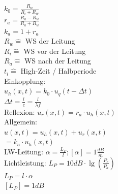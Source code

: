 \documentclass[8pt]{extarticle}
\begin{document}
\begin{minipage}{0.33\textwidth}
$k_0 = \frac{R_w}{R_i + R_w} $\\
$r_a = \frac{R_a - R_w}{R_a + R_w} $\\
$k_a = 1 + r_a$\\
$R_w \hat{=}$ WS der Leitung\\
$R_i \hat{=}$ WS vor der Leitung\\
$R_a \hat{=}$ WS nach der Leitung\\
$t_i \hat{=}$ High-Zeit / Halbperiode\\
Einkopplung:\\
\phantom{ss} $u_h(x,t)= k_0 \cdot u_{q}(t-\Delta t)$\\
\phantom{sss}$\Delta t = \frac{l}{c} = \frac{l}{\lambda f}$\\
Reflexion: $u_r(x,t) = r_a \cdot u_h(x,t)$\\
Allgemein:\\
\phantom{ss} $u(x,t) = u_h(x,t) + u_r(x,t)$\\
\phantom{sssssssiss} $= k_a \cdot u_h(x,t)$\\

LW-Leitung: $\alpha = \frac{L_P}{l}; [\alpha] = 1 \frac{dB}{m}$\\
Lichtleistung: $L_P = 10dB \cdot \lg (\frac{P_e}{P_a})$\\
\phantom{sssssississsssss} $L_P = l \cdot \alpha$\\
\phantom{sssssississsssss}$ [L_P] = 1dB$\\



\end{minipage}%
~~~~~~
\end{document}

